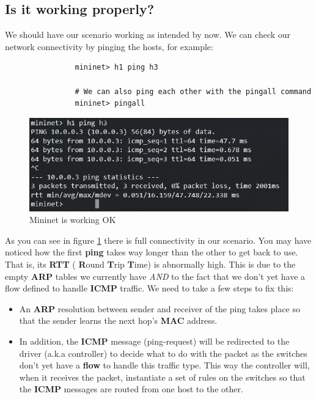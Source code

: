 \documentclass[12pt]{report}
\begin{document}
		\subsection{Is it working properly?}
			We should have our scenario working as intended by now. We can check our network connectivity by pinging the hosts, for example:

			\begin{verbatim}
				mininet> h1 ping h3

				# We can also ping each other with the pingall command
				mininet> pingall
			\end{verbatim}

			\begin{figure}
				\centering
				\includegraphics[scale = 1]{ping_ok.png}
				\caption{Mininet is working OK}
				\label{f:ping_ok}
			\end{figure}

			As you can see in figure \ref{f:ping_ok} there is full connectivity in our scenario. You may have noticed how the first  \textbf{ping} takes way longer than the other to get back to use. That is, its  \textbf{RTT} ( \textbf{R}ound  \textbf{T}rip  \textbf{T}ime) is abnormally high. This is due to the empty  \textbf{ARP} tables we currently have \textit{AND} to the fact that we don't yet have a flow defined to handle  \textbf{ICMP} traffic. We need to take a few steps to fix this:

			\begin{itemize}
				\item An \textbf{ARP} resolution between sender and receiver of the ping takes place so that the sender learns the next hop's \textbf{MAC} address.
				\item In addition, the \textbf{ICMP} message (ping-request) will be redirected to the driver (a.k.a controller) to decide what to do with the packet as the switches don't yet have a \textbf{flow} to handle this traffic type. This way the controller will, when it receives the packet, instantiate a set of rules on the switches so that the \textbf{ICMP} messages are routed from one host to the other.
			\end{itemize}
\end{document}
